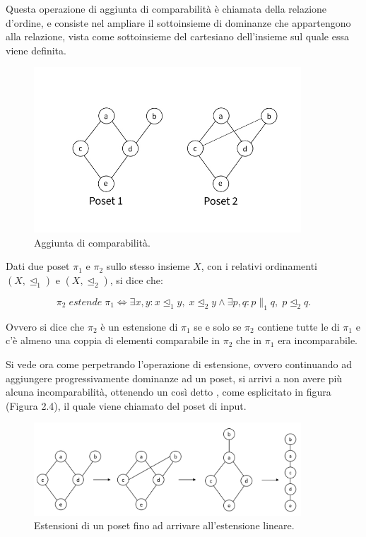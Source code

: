 \documentclass{report}
\begin{document}
Questa operazione di aggiunta di comparabilità è chiamata  della relazione d'ordine, e consiste nel ampliare il sottoinsieme di dominanze che appartengono alla relazione, vista come sottoinsieme del cartesiano dell'insieme sul quale essa viene definita.

\begin{figure}[H]
    \centering
    \includegraphics[width=10cm]{IMAGES/poset_5.jpg}
    \caption{Aggiunta di comparabilità.}
    \label{fig:roc}
\end{figure}


\begin{definition}[Estensione]
Dati due poset $\pi_1$ e $\pi_2$ sullo stesso insieme $X$, con i relativi ordinamenti $(X,\unlhd_1)$ e $(X,\unlhd_2)$, si dice che: 

\[ \pi_2 \;estende\; \pi_1 \Leftrightarrow \exists x,y: x\unlhd_1 y ,\; x\unlhd_2 y \land \exists p,q: p\parallel_1 q,\; p\unlhd_2 q .\]

Ovvero si dice che $\pi_2$ è un estensione di $\pi_1$ se e solo se $\pi_2$ contiene tutte le  di $\pi_1$ e c'è almeno una coppia di elementi comparabile in $\pi_2$ che in $\pi_1$ era incomparabile. 
\end{definition}

Si vede ora come perpetrando l'operazione di estensione, ovvero continuando ad aggiungere progressivamente dominanze ad un poset, si arrivi a non avere più alcuna incomparabilità, ottenendo un così detto , come esplicitato in figura (Figura 2.4), il quale viene chiamato  del poset di input.

\begin{figure}[H]
    \centering
    \includegraphics[width=10cm]{IMAGES/poset_6.png}
    \caption{Estensioni di un poset fino ad arrivare all'estensione lineare.}
    \label{fig:roc}
\end{figure}
\end{document}
